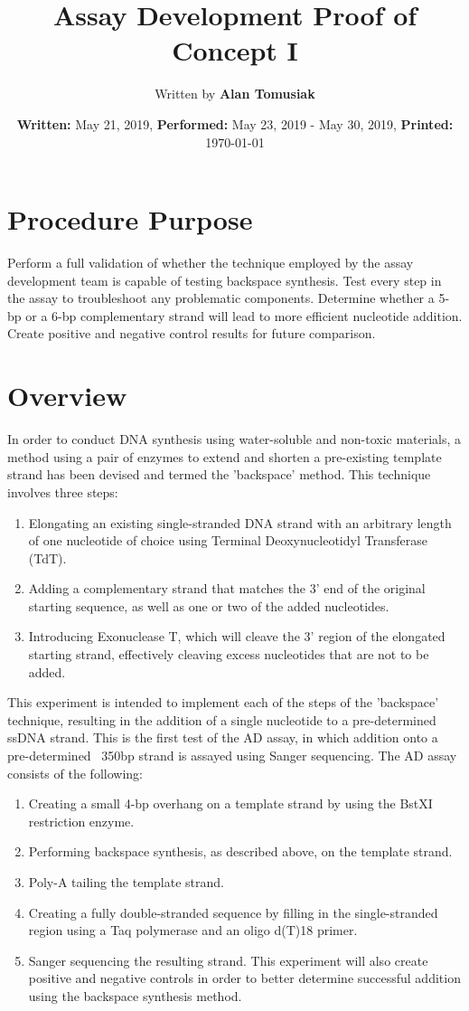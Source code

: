 \documentclass{ssiBio}
\title{Assay Development Proof of Concept I}
\author{Written by \textbf{Alan Tomusiak}}
\date{\textbf{Written:} May 21, 2019, \textbf{Performed:} May 23, 2019 - May 30, 2019, \textbf{Printed:} \today{}}
\begin{document}
\maketitle
\section{Procedure Purpose}
Perform a full validation of whether the technique employed by the assay development team is capable of testing backspace synthesis. Test every step in the assay to troubleshoot any problematic components. Determine whether a 5-bp or a 6-bp complementary strand will lead to more efficient nucleotide addition. Create positive and negative control results for future comparison.

\section{Overview}
In order to conduct DNA synthesis using water-soluble and non-toxic materials, a method using a pair of enzymes to extend and shorten a pre-existing template strand has been devised and termed the 'backspace' method. This technique involves three steps:
\begin{enumerate}
\item{Elongating an existing single-stranded DNA strand with an arbitrary length of one nucleotide of choice using Terminal Deoxynucleotidyl Transferase (TdT).}
\item{Adding a complementary strand that matches the 3' end of the original starting sequence, as well as one or two of the added nucleotides.}
\item{Introducing Exonuclease T, which will cleave the 3' region of the elongated starting strand, effectively cleaving excess nucleotides that are not to be added. \cite{zuo_deutscher_1999}}
\end{enumerate}
This experiment is intended to implement each of the steps of the 'backspace' technique, resulting in the addition of a single nucleotide to a pre-determined ssDNA strand. This is the first test of the AD assay, in which addition onto a pre-determined ~350bp strand is assayed using Sanger sequencing. The AD assay consists of the following:
\begin{enumerate}
\item{Creating a small 4-bp overhang on a template strand by using the BstXI restriction enzyme.}
\item{Performing backspace synthesis, as described above, on the template strand.}
\item{Poly-A tailing the template strand.}
\item{Creating a fully double-stranded sequence by filling in the single-stranded region using a Taq polymerase and an oligo d(T)18 primer.}
\item{Sanger sequencing the resulting strand.}
This experiment will also create positive and negative controls in order to better determine successful addition using the backspace synthesis method.
\end{enumerate}
\end{document}
